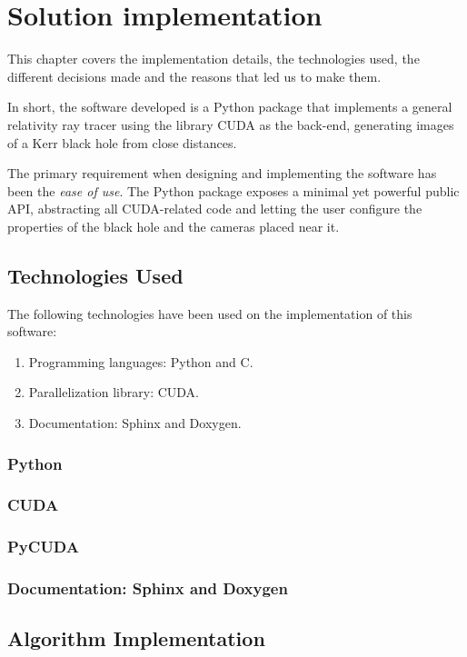 \chapter{Solution implementation}

This chapter covers the implementation details, the technologies used, the different decisions made and the reasons that led us to make them.

In short, the software developed is a Python package that implements a general relativity ray tracer using the library \ac{CUDA} as the back-end, generating images of a Kerr black hole from close distances.

The primary requirement when designing and implementing the software has been the \emph{ease of use}. The Python package exposes a minimal yet powerful public \ac{API}, abstracting all \ac{CUDA}-related code and letting the user configure the properties of the black hole and the cameras placed near it.

\section{Technologies Used}

The following technologies have been used on the implementation of this software:
\begin{enumerate}
	\item Programming languages: Python and C.
	\item Parallelization library: CUDA.
	\item Documentation: Sphinx and Doxygen.
\end{enumerate}

\subsection{Python}
\subsection{CUDA}
\subsection{PyCUDA}
\subsection{Documentation: Sphinx and Doxygen}

\section{Algorithm Implementation}
